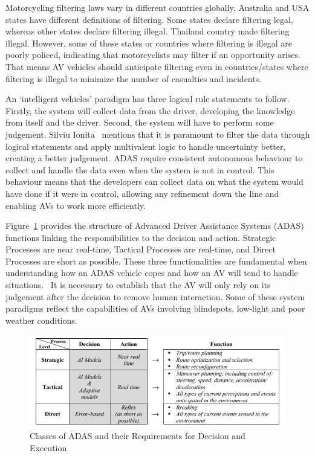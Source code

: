 \documentclass[12pt]{report} %
\begin{document}
		Motorcycling filtering laws vary in different countries globally. Australia and USA states have different definitions of filtering. Some states declare filtering legal, whereas other states declare filtering illegal. Thailand country made filtering illegal. However, some of these states or countries where filtering is illegal are poorly policed, indicating that motorcyclists may filter if an opportunity arises. That means AV vehicles should anticipate filtering even in countries/states where filtering is illegal to minimize the number of casualties and incidents.~\cite{promraksa_lane-filtering_2022}

		An `intelligent vehicles' paradigm has three logical rule statements to follow. Firstly, the system will collect data from the driver, developing the knowledge from itself and the driver. Second, the system will have to perform some judgement. Silviu Ionita~\cite{ionita_autonomous_2017} mentions that it is paramount to filter the data through logical statements and apply multivalent logic to handle uncertainty better, creating a better judgement. ADAS require consistent autonomous behaviour to collect and handle the data even when the system is not in control. This behaviour means that the developers can collect data on what the system would have done if it were in control, allowing any refinement down the line and enabling AVs to work more efficiently.

		Figure~\ref{fig:adasFunctionsIonita} provides the structure of Advanced Driver Assistance Systems (ADAS) functions linking the responsibilities to the decision and action. Strategic Processes are near real-time, Tactical Processes are real-time, and Direct Processes are short as possible. These three functionalities are fundamental when understanding how an ADAS vehicle copes and how an AV will tend to handle situations.~\cite{ionita_autonomous_2017} It is necessary to establish that the AV will only rely on its judgement after the decision to remove human interaction. Some of these system paradigms reflect the capabilities of AVs involving blindspots, low-light and poor weather conditions.
		\begin{figure}[h]
			\centering
			\includegraphics[width=\columnwidth]{Figures/literature_review/proposal/SystemFunctionality-3.png}
			\caption{Classes of ADAS and their Requirements for Decision and Execution~\cite{ionita_autonomous_2017}}
			\label{fig:adasFunctionsIonita}
		\end{figure}
\end{document}

